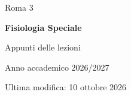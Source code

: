 \documentclass[11pt,a4paper,twoside,openany]{book}
\newcommand{\NomeCorso}{Fisiologia Speciale}
\newcommand{\AnnoAccademico}{2026/2027}
\newcommand{\Universita}{Roma 3}
\newcommand{\DataUltimaModifica}{10 ottobre 2026}
\begin{document}
\begin{titlepage}
    \thispagestyle{empty}
    \centering

    \vspace*{3cm}

    {\Large \Universita\par}

    \vspace{3cm}

    {\Huge\bfseries \NomeCorso\par}

    \vspace{0.7cm}

    {\Large Appunti delle lezioni\par}

    \vfill

    {\large Anno accademico \AnnoAccademico\par}

    \vspace{0.5cm}

    {\large Ultima modifica: \DataUltimaModifica\par}

    \vspace*{2cm}
\end{titlepage}

\frontmatter
\tableofcontents

\mainmatter



\end{document}
